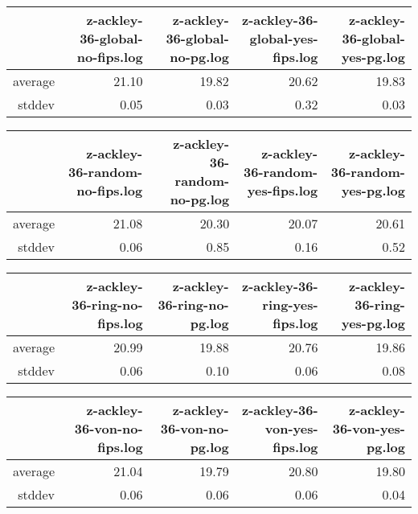 \begin{table}[ht]
\centering
\begin{tabular}{rrrrr}
  \hline
 & z-ackley-36-global-no-fips.log & z-ackley-36-global-no-pg.log & z-ackley-36-global-yes-fips.log & z-ackley-36-global-yes-pg.log \\ 
  \hline
average & 21.10 & 19.82 & 20.62 & 19.83 \\ 
  stddev & 0.05 & 0.03 & 0.32 & 0.03 \\ 
   \hline
\end{tabular}
\end{table}
\begin{table}[ht]
\centering
\begin{tabular}{rrrrr}
  \hline
 & z-ackley-36-random-no-fips.log & z-ackley-36-random-no-pg.log & z-ackley-36-random-yes-fips.log & z-ackley-36-random-yes-pg.log \\ 
  \hline
average & 21.08 & 20.30 & 20.07 & 20.61 \\ 
  stddev & 0.06 & 0.85 & 0.16 & 0.52 \\ 
   \hline
\end{tabular}
\end{table}
\begin{table}[ht]
\centering
\begin{tabular}{rrrrr}
  \hline
 & z-ackley-36-ring-no-fips.log & z-ackley-36-ring-no-pg.log & z-ackley-36-ring-yes-fips.log & z-ackley-36-ring-yes-pg.log \\ 
  \hline
average & 20.99 & 19.88 & 20.76 & 19.86 \\ 
  stddev & 0.06 & 0.10 & 0.06 & 0.08 \\ 
   \hline
\end{tabular}
\end{table}
\begin{table}[ht]
\centering
\begin{tabular}{rrrrr}
  \hline
 & z-ackley-36-von-no-fips.log & z-ackley-36-von-no-pg.log & z-ackley-36-von-yes-fips.log & z-ackley-36-von-yes-pg.log \\ 
  \hline
average & 21.04 & 19.79 & 20.80 & 19.80 \\ 
  stddev & 0.06 & 0.06 & 0.06 & 0.04 \\ 
   \hline
\end{tabular}
\end{table}
